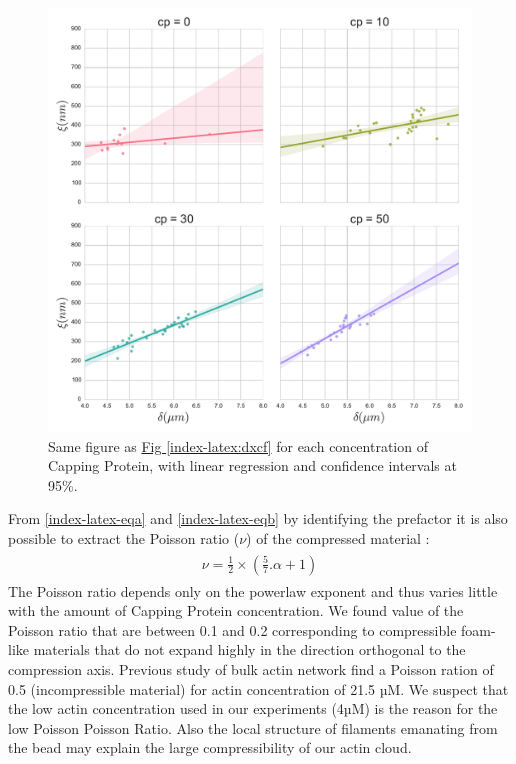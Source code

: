 \documentclass[A4paperpaper,11pt,english]{sphinxmanual}
\begin{document}
\begin{figure}[htbp]
\centering
\capstart

\includegraphics[width=1.000\linewidth]{delta-xi-facets.pdf}
\caption{Same figure as \hyperref[index-latex:dxcf]{Fig  \ref*{index-latex:dxcf}} for each concentration of Capping Protein,
with linear regression and confidence intervals at 95\%.}\label{index-latex:dxf}\end{figure}

From \eqref{index-latex-eqa} and \eqref{index-latex-eqb} by identifying the prefactor it is also possible
to extract the Poisson ratio (\(\nu\)) of the compressed material :
\label{index-latex:equation-nu=f(alpha)}\begin{gather}
\begin{split}\nu =\frac 1 2 \times \left( \frac 5 7.\alpha +1\right)\end{split}\label{index-latex-nu=f(alpha)}
\end{gather}
The Poisson ratio depends only on the powerlaw exponent and thus varies little
with the amount of Capping Protein concentration.  We found value of the
Poisson ratio that are between 0.1 and 0.2 corresponding to compressible
foam-like materials that do not expand highly in the direction orthogonal to
the compression axis. Previous study of bulk actin network find a Poisson
ration of 0.5 (incompressible material) for actin concentration of 21.5 µM.  We
suspect that the low actin concentration used in our experiments (4µM) is the
reason for the low Poisson Poisson Ratio. Also the local structure of filaments
emanating from the  bead may explain the large compressibility of our actin
cloud.
\end{document}
